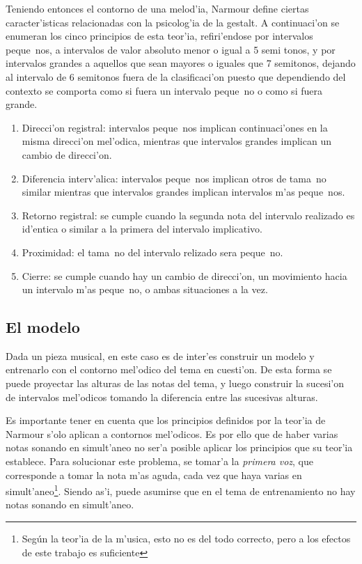 Teniendo entonces el contorno de una melod'ia, Narmour define ciertas caracter'isticas relacionadas con la psicolog'ia de la gestalt. A continuaci'on 
se enumeran los cinco principios de esta teor'ia, refiri'endose por intervalos peque~nos, a intervalos de valor absoluto menor o igual a 5 semi tonos, y por intervalos
grandes a aquellos que sean mayores o iguales que 7 semitonos, dejando al intervalo de 6 semitonos fuera de la clasificaci'on puesto que dependiendo del contexto
se comporta como si fuera un intervalo peque~no o como si fuera grande.
\begin{enumerate}
 \item Direcci'on registral: intervalos peque~nos implican continuaci'ones en la misma direcci'on mel'odica, mientras que intervalos grandes implican un cambio de direcci'on.
 \item Diferencia interv'alica: intervalos peque~nos implican otros de tama~no similar mientras que intervalos grandes implican intervalos m'as peque~nos. 
 \item Retorno registral: se cumple cuando la segunda nota del intervalo realizado es id'entica o similar a la primera del intervalo implicativo.
 \item Proximidad: el tama~no del intervalo relizado sera peque~no.
 \item Cierre: se cumple cuando hay un cambio de direcci'on, un movimiento hacia un intervalo m'as peque~no, o ambas situaciones a la vez.
\end{enumerate}

\subsection{El modelo}
\label{sec:contour_model}
Dada un pieza musical, en este caso es de inter'es construir un modelo y entrenarlo con el contorno mel'odico del tema en cuesti'on. De esta forma se puede proyectar
las alturas de las notas del tema, y luego construir la sucesi'on de intervalos mel'odicos tomando la diferencia entre las sucesivas alturas. 

Es importante tener en cuenta que los principios definidos por la teor'ia de Narmour s'olo aplican a contornos mel'odicos. 
Es por ello que de haber varias notas sonando en simult'aneo no ser'a posible aplicar los principios que su teor'ia establece. 
Para solucionar este problema, se tomar'a la \emph{primera voz}, que corresponde a tomar la nota m'as aguda, cada vez que haya varias en simult'aneo\footnote{Seg\'un
la teor'ia de la m'usica, esto no es del todo correcto, pero a los efectos de este trabajo es suficiente}. 
Siendo as'i, puede asumirse que en el tema de entrenamiento no hay notas sonando en simult'aneo. 

